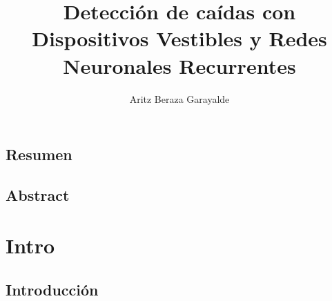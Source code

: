 \documentclass[11pt,a4paper,spanish]{book}
\title{Detección de caídas con Dispositivos Vestibles y Redes Neuronales Recurrentes}
\author{Aritz Beraza Garayalde}
\date{\currenttime}
\begin{document}



\renewcommand{\listfigurename}{Índice de Ilustraciones}
\renewcommand{\listtablename}{Índice de Tablas}
\renewcommand{\contentsname}{Índice de Contenidos}
\renewcommand{\figurename}{Figura}
\renewcommand{\tablename}{Tabla}

\maketitle
\frontmatter
\tableofcontents
\listoffigures
\listoftables

\mainmatter

\section*{Resumen}


\section*{Abstract}



\chapter{Intro}\label{chap:intro}
\section{Introducción}

\end{document}
